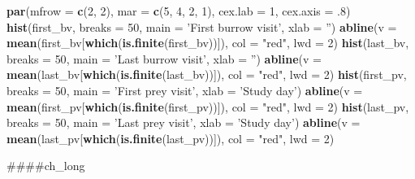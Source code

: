 \documentclass[]{article}
\newenvironment{Shaded}{\begin{snugshade}}{\end{snugshade}}
\newcommand{\KeywordTok}[1]{\textcolor[rgb]{0.13,0.29,0.53}{\textbf{#1}}}
\newcommand{\DataTypeTok}[1]{\textcolor[rgb]{0.13,0.29,0.53}{#1}}
\newcommand{\DecValTok}[1]{\textcolor[rgb]{0.00,0.00,0.81}{#1}}
\newcommand{\StringTok}[1]{\textcolor[rgb]{0.31,0.60,0.02}{#1}}
\newcommand{\NormalTok}[1]{#1}
\begin{document}
\begin{Shaded}
\begin{Highlighting}[]
{\KeywordTok{par}\NormalTok{(}\DataTypeTok{mfrow =} \KeywordTok{c}\NormalTok{(}\DecValTok{2}\NormalTok{, }\DecValTok{2}\NormalTok{), }\DataTypeTok{mar =} \KeywordTok{c}\NormalTok{(}\DecValTok{5}\NormalTok{, }\DecValTok{4}\NormalTok{, }\DecValTok{2}\NormalTok{, }\DecValTok{1}\NormalTok{), }\DataTypeTok{cex.lab =} \DecValTok{1}\NormalTok{, }\DataTypeTok{cex.axis =}\NormalTok{ .}\DecValTok{8}\NormalTok{)}
\KeywordTok{hist}\NormalTok{(first_bv, }\DataTypeTok{breaks =} \DecValTok{50}\NormalTok{, }\DataTypeTok{main =} \StringTok{'First burrow visit'}\NormalTok{, }\DataTypeTok{xlab =} \StringTok{''}\NormalTok{)}
\KeywordTok{abline}\NormalTok{(}\DataTypeTok{v =} \KeywordTok{mean}\NormalTok{(first_bv[}\KeywordTok{which}\NormalTok{(}\KeywordTok{is.finite}\NormalTok{(first_bv))]), }\DataTypeTok{col =} \StringTok{"red"}\NormalTok{, }\DataTypeTok{lwd =} \DecValTok{2}\NormalTok{)}
\KeywordTok{hist}\NormalTok{(last_bv, }\DataTypeTok{breaks =} \DecValTok{50}\NormalTok{, }\DataTypeTok{main =} \StringTok{'Last burrow visit'}\NormalTok{, }\DataTypeTok{xlab =} \StringTok{''}\NormalTok{)}
\KeywordTok{abline}\NormalTok{(}\DataTypeTok{v =} \KeywordTok{mean}\NormalTok{(last_bv[}\KeywordTok{which}\NormalTok{(}\KeywordTok{is.finite}\NormalTok{(last_bv))]), }\DataTypeTok{col =} \StringTok{"red"}\NormalTok{, }\DataTypeTok{lwd =} \DecValTok{2}\NormalTok{)}
\KeywordTok{hist}\NormalTok{(first_pv, }\DataTypeTok{breaks =} \DecValTok{50}\NormalTok{, }\DataTypeTok{main =} \StringTok{'First prey visit'}\NormalTok{, }\DataTypeTok{xlab =} \StringTok{'Study day'}\NormalTok{)}
\KeywordTok{abline}\NormalTok{(}\DataTypeTok{v =} \KeywordTok{mean}\NormalTok{(first_pv[}\KeywordTok{which}\NormalTok{(}\KeywordTok{is.finite}\NormalTok{(first_pv))]), }\DataTypeTok{col =} \StringTok{"red"}\NormalTok{, }\DataTypeTok{lwd =} \DecValTok{2}\NormalTok{)}
\KeywordTok{hist}\NormalTok{(last_pv, }\DataTypeTok{breaks =} \DecValTok{50}\NormalTok{, }\DataTypeTok{main =} \StringTok{'Last prey visit'}\NormalTok{, }\DataTypeTok{xlab =} \StringTok{'Study day'}\NormalTok{)}
\KeywordTok{abline}\NormalTok{(}\DataTypeTok{v =} \KeywordTok{mean}\NormalTok{(last_pv[}\KeywordTok{which}\NormalTok{(}\KeywordTok{is.finite}\NormalTok{(last_pv))]), }\DataTypeTok{col =} \StringTok{"red"}\NormalTok{, }\DataTypeTok{lwd =} \DecValTok{2}\NormalTok{)}

\NormalTok{####ch_long}
 
}
\end{Highlighting}
\end{Shaded}
\end{document}
